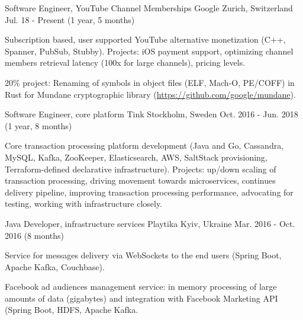 

\begin{cventries}

  \cventry
    {Software Engineer, YouTube Channel Memberships} %
    {Google} %
    {Zurich, Switzerland} %
    {Jul. 18 - Present (1 year, 5 months)} %
    {
      \begin{cvitems}
        \item {Subscription based, user supported YouTube alternative monetization (C++, Spanner, PubSub, Stubby). Projects: iOS payment support, optimizing channel members retrieval latency (100x for large channels), pricing levels.}
        \item {20\% project: Renaming of symbols in object files (ELF, Mach-O, PE/COFF) in Rust for Mundane cryptographic library (\url{https://github.com/google/mundane}).}
      \end{cvitems}
    }

  \cventry
    {Software Engineer, core platform} %
    {Tink} %
    {Stockholm, Sweden} %
    {Oct. 2016 - Jun. 2018 (1 year, 8 months)} %
    {
      \begin{cvitems} %
        \item {Core transaction processing platform development (Java and Go, Cassandra, MySQL, Kafka, ZooKeeper, Elasticsearch, AWS, SaltStack provisioning, Terraform-defined declarative infrastructure). Projects: up/down scaling of transaction processing, driving movement towards microservices, continues delivery pipeline, improving transaction processing performance, advocating for testing, working with infrastructure closely.}
      \end{cvitems}
    }

  \cventry
    {Java Developer, infrastructure services} %
    {Playtika} %
    {Kyiv, Ukraine} %
    {Mar. 2016 - Oct. 2016 (8 months)} %
    {
      \begin{cvitems} %
        \item {Service for messages delivery via WebSockets to the end users (Spring Boot, Apache Kafka, Couchbase).}
        \item {Facebook ad audiences management service: in memory processing of large amounts of data (gigabytes) and integration with Facebook Marketing API (Spring Boot, HDFS, Apache Kafka.}
      \end{cvitems}
    }


\end{cventries}
